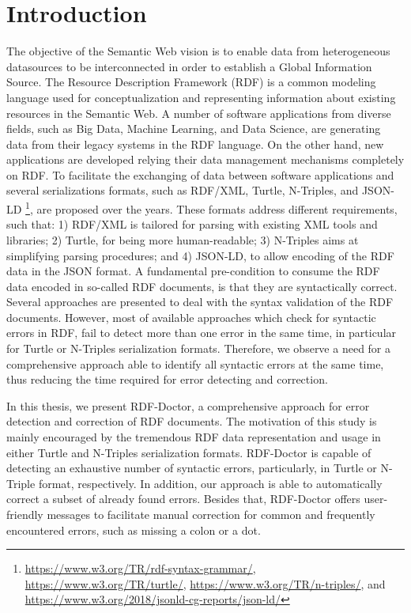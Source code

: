 \chapter{Introduction}
\label{ch:introduction}

\par 
The objective of the Semantic Web vision is to enable data from heterogeneous datasources to be interconnected in order to establish a Global Information Source. 
The Resource Description Framework (RDF) is a common modeling language used for conceptualization and representing information about existing resources in the Semantic Web.
A number of software applications from diverse fields, such as Big Data, Machine Learning, and Data Science, are generating data from their legacy systems in the RDF language. 
On the other hand, new applications are developed relying their data management mechanisms completely on RDF.
To facilitate the exchanging of data between software applications and several serializations formats, such as RDF{/}XML, Turtle, N-Triples, and JSON-LD \footnote{\url{https://www.w3.org/TR/rdf-syntax-grammar/}, \url{https://www.w3.org/TR/turtle/}, \url{https://www.w3.org/TR/n-triples/}, and \url{https://www.w3.org/2018/jsonld-cg-reports/json-ld/}}, are proposed over the years.
These formats address different requirements, such that: 1) RDF{/}XML is tailored for parsing with existing XML tools and libraries; 2) Turtle, for being more human-readable; 3) N-Triples aims at simplifying parsing procedures; and 4) JSON-LD, to allow encoding of the RDF data in the JSON format.
A fundamental pre-condition to consume the RDF data encoded in so-called RDF documents, is that they are syntactically correct.
Several approaches are presented to deal with the syntax validation of the RDF documents.
However, most of available approaches which check for syntactic errors in RDF, fail to detect more than one error in the same time, in particular for Turtle or N-Triples serialization formats. 
Therefore, we observe a need for a comprehensive approach able to identify all syntactic errors at the same time, thus reducing the time required for error detecting and correction.

In this thesis, we present RDF-Doctor, a comprehensive approach for error detection and correction of RDF documents.
The motivation of this study is mainly encouraged by the  tremendous RDF data representation and usage in either Turtle and N-Triples serialization formats.
RDF-Doctor is capable of detecting an exhaustive number of syntactic errors, particularly, in Turtle or N-Triple format, respectively. 
In addition, our approach is able to automatically correct a subset of already found errors.
Besides that, RDF-Doctor offers user-friendly messages to facilitate manual correction for common and frequently encountered errors, such as missing a colon or a dot.  

